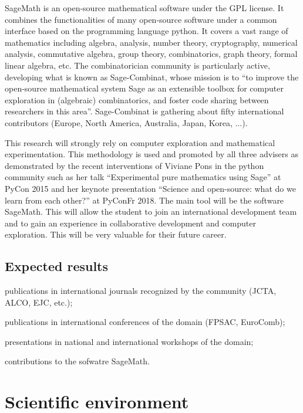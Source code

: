 \documentclass[a4paper,12pt]{article}
\begin{document}
SageMath is an open-source mathematical software under the GPL license. It combines the functionalities of many open-source software under a common interface based on the programming language python. It covers a vast range of mathematics including algebra, analysis, number theory, cryptography, numerical analysis, commutative algebra, group theory, combinatorics, graph theory, formal linear algebra, etc. The combinatorician community is particularly active, developing what is known as Sage-Combinat, whose mission is to ``to improve the open-source mathematical system Sage as an extensible toolbox for computer exploration in (algebraic) combinatorics, and foster code sharing between researchers in this area''. Sage-Combinat is gathering about fifty international contributors (Europe, North America, Australia, Japan, Korea, ...).

This research will strongly rely on computer exploration and mathematical experimentation. This methodology is used and promoted by all three advisers as demonstrated by the recent interventions of Viviane Pons in the python community such as her talk ``Experimental pure mathematics using Sage'' at PyCon 2015 and her keynote presentation ``Science and open-source: what do we learn from each other?'' at PyConFr 2018. The main tool will be the software SageMath. This will allow the student to join an international development team and to gain an experience in collaborative development and computer exploration. This will be very valuable for their future career. 


\subsection{Expected results}

\begin{compactitem}
\item publications in international journals recognized by the community (JCTA, ALCO, EJC, etc.);
\item publications in international conferences of the domain (FPSAC, EuroComb);
\item presentations in national and international workshops of the domain;
\item contributions to the sofwatre SageMath.
\end{compactitem}

\section{Scientific environment}
\end{document}
